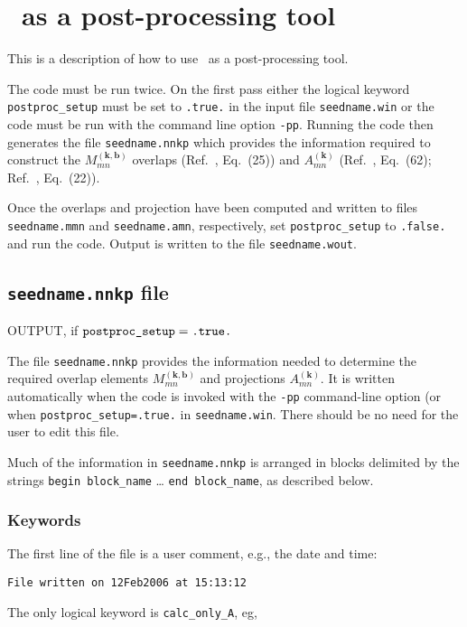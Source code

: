 \chapter{\wannier\ as a post-processing tool} \label{ch:wann-pp}

This is a description of how to use \wannier\ as a
post-processing tool. 

The code must be run twice. On the first pass either the logical keyword
\verb#postproc_setup# must be set to \verb#.true.# in the input file
\verb#seedname.win# or the code must be run with the command line
option \verb#-pp#.  Running the code then generates the file
\verb#seedname.nnkp# which provides the information required to 
construct the $M_{mn}^{(\mathbf{k,b})}$ overlaps (Ref.~\cite{MV},
Eq.~(25)) and $A_{mn}^{(\mathbf{k})}$ (Ref.~\cite{MV}, Eq.~(62);
Ref.~\cite{SMV}, Eq.~(22)).

Once the overlaps and projection have been computed and written to
files \verb#seedname.mmn# and \verb#seedname.amn#, respectively,
set \verb#postproc_setup# to \verb#.false.# and run the code. Output is
written to the file \verb#seedname.wout#.


\section{{\tt seedname.nnkp} file}

OUTPUT, if $\verb#postproc_setup#=\verb#.true.#$

The file \verb#seedname.nnkp# provides the information needed to
determine the required overlap elements $M_{mn}^{(\mathbf{k,b})}$ and
projections $A_{mn}^{(\mathbf{k})}$. It is written automatically when
the code is invoked with the \verb#-pp# command-line option (or when
\verb#postproc_setup=.true.# in \verb#seedname.win#. There should be
no need for the user to edit this file.

Much of the information in \verb#seedname.nnkp# is arranged in blocks
delimited by the strings \verb#begin block_name# \ldots
\verb#end block_name#, as described below. 


\subsection{Keywords}
The first line of the file is a user comment, e.g., the date and time:

\verb#File written on 12Feb2006 at 15:13:12#

\noindent 
The only logical keyword is \verb#calc_only_A#, eg,

